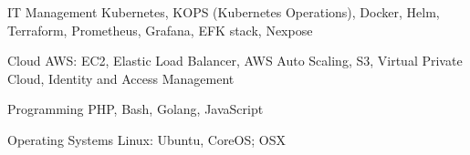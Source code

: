 


\begin{cvskills}


\cvskill
{IT Management} %
{Kubernetes, KOPS (Kubernetes Operations), Docker, Helm, Terraform, Prometheus, Grafana, EFK stack, Nexpose} %


\cvskill
{Cloud} %
{AWS: EC2, Elastic Load Balancer, AWS Auto Scaling, S3, Virtual Private Cloud, Identity and Access Management} %


\cvskill
{Programming} %
{PHP, Bash, Golang, JavaScript} %


\cvskill
{Operating Systems} %
{Linux: Ubuntu, CoreOS; OSX}


\end{cvskills}
